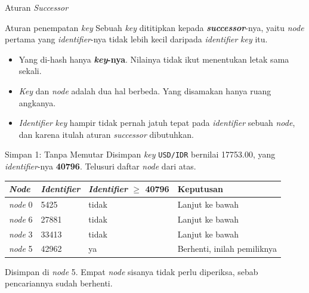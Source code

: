 \documentclass[aspectratio=169, table, 12pt]{beamer}
\begin{document}
\begin{frame}{{\Large Aturan \textit{Successor}}}
  \vspace{18pt}
  \begin{block}{Aturan penempatan \textit{key}}
    Sebuah \textit{key} dititipkan kepada \textbf{\textit{successor}}-nya, yaitu \textit{node}
    pertama yang \textit{identifier}-nya tidak lebih kecil daripada \textit{identifier} \textit{key} itu.
  \end{block}
  \vspace{10pt}
  \begin{itemize}\small
    \item Yang di-hash hanya \textbf{\textit{key}-nya}. Nilainya tidak ikut menentukan
          letak sama sekali.
    \item \textit{Key} dan \textit{node} adalah dua hal berbeda. Yang disamakan hanya
          ruang angkanya.
    \item \textit{Identifier} \textit{key} hampir tidak pernah jatuh tepat pada \textit{identifier} sebuah
          \textit{node}, dan karena itulah aturan \textit{successor} dibutuhkan.
  \end{itemize}
\end{frame}

\begin{frame}{{\Large Simpan 1: Tanpa Memutar}}
  \vspace{4pt}
  {\small Disimpan \textit{key} \texttt{USD/IDR} bernilai 17753.00, yang \textit{identifier}-nya
  \textbf{40796}. Telusuri daftar \textit{node} dari atas.}
  \vspace{6pt}
  \centering
  \small
  \begin{tabularx}{0.92\textwidth}{|l|l|l|X|}
    \hline
    \textbf{\textit{Node}} & \textbf{\textit{Identifier}} & \textbf{\textit{Identifier} $\geq$ 40796} & \textbf{Keputusan} \\
    \hline
    \textit{node} 0 & 5425 & tidak & Lanjut ke bawah \\
    \hline
    \textit{node} 6 & 27881 & tidak & Lanjut ke bawah \\
    \hline
    \textit{node} 3 & 33413 & tidak & Lanjut ke bawah \\
    \hline
    \textit{node} 5 & 42962 & ya & Berhenti, inilah pemiliknya \\
    \hline
  \end{tabularx}

  \vspace{6pt}
  {\small Disimpan di \textit{node} 5. Empat \textit{node} sisanya tidak perlu
  diperiksa, sebab pencariannya sudah berhenti.}
\end{frame}
\end{document}
